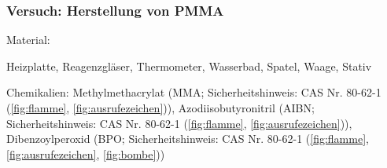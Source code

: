 \subsubsection{Versuch: Herstellung von PMMA}
\label{subsubsec:versuchpmma}

Material:
\begin{itemize*}
    \item Heizplatte, Reagenzgläser, Thermometer, Wasserbad, Spatel, Waage, Stativ
    \item Chemikalien: Methylmethacrylat (MMA; Sicherheitshinweis: CAS Nr. 80-62-1 (\autoref{fig:flamme}, \autoref{fig:ausrufezeichen})), Azodiisobutyronitril (AIBN; Sicherheitshinweis: CAS Nr. 80-62-1 (\autoref{fig:flamme}, \autoref{fig:ausrufezeichen})), Dibenzoylperoxid (BPO; Sicherheitshinweis: CAS Nr. 80-62-1 (\autoref{fig:flamme}, \autoref{fig:ausrufezeichen}, \autoref{fig:bombe}))
\end{itemize*}

